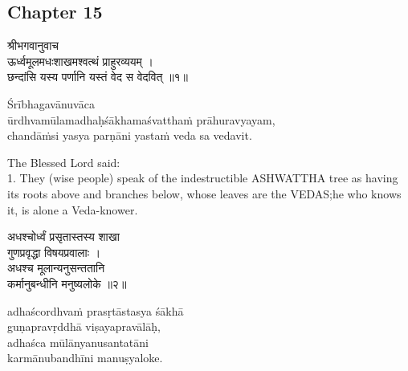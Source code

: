 \chapterdrop

\begin{center}

\headerspace
{}

\section{Chapter 15}

\headerspace
{}

\headerspace
{}

\headerspace
{}

\headerspace
\end{center}

\begin{gitaverse}
श्रीभगवानुवाच \\
ऊर्ध्वमूलमधःशाखमश्वत्थं प्राहुरव्ययम् । \\
छन्दांसि यस्य पर्णानि यस्तं वेद स वेदवित् ॥१॥
\end{gitaverse}

\begin{transliteration}
Śrībhagavānuvāca \\
ūrdhvamūlamadhaḥśākhamaśvatthaṁ prāhuravyayam, \\
chandāṁsi yasya parṇāni yastaṁ veda sa vedavit.
\end{transliteration}

The Blessed Lord said: \\
1. They (wise people) speak of the indestructible ASHWATTHA tree as having its
roots above and branches below, whose leaves are the VEDAS;\@ he who knows it,
is alone a Veda-knower.

\begin{gitaverse}
अधश्चोर्ध्वं प्रसृतास्तस्य शाखा \\
\tab गुणप्रवृद्धा विषयप्रवालाः । \\
अधश्च मूलान्यनुसन्ततानि \\
\tab कर्मानुबन्धीनि मनुष्यलोके ॥२॥
\end{gitaverse}

\begin{transliteration}
adhaścordhvaṁ prasṛtāstasya śākhā \\
\tab guṇapravṛddhā viṣayapravālāḥ, \\
adhaśca mūlānyanusantatāni \\
\tab karmānubandhīni manuṣyaloke.
\end{transliteration}

